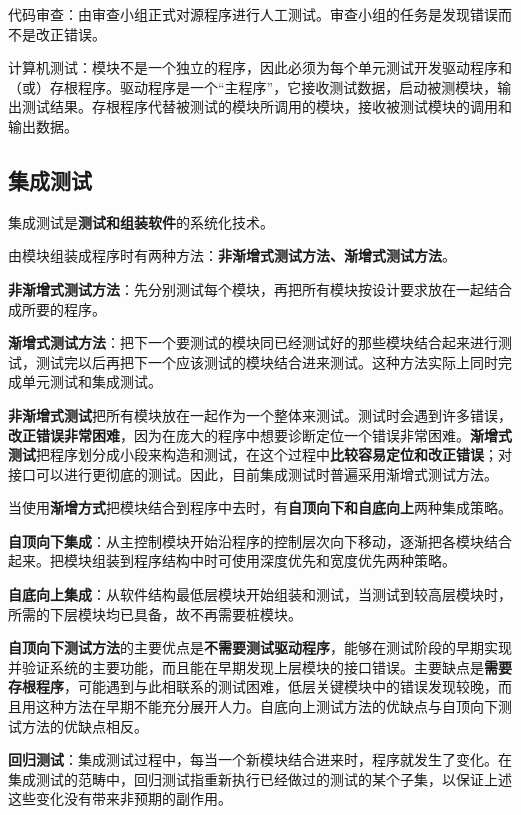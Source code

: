 \documentclass[cn, blue, normal, 12pt]{elegantnote}
\begin{document}
代码审查：由审查小组正式对源程序进行人工测试。审查小组的任务是发现错误而不是改正错误。

计算机测试：模块不是一个独立的程序，因此必须为每个单元测试开发驱动程序和（或）存根程序。驱动程序是一个“主程序”，它接收测试数据，启动被测模块，输出测试结果。存根程序代替被测试的模块所调用的模块，接收被测试模块的调用和输出数据。

\subsection{集成测试}

集成测试是\textbf{测试和组装软件}的系统化技术。

由模块组装成程序时有两种方法：\textbf{非渐增式测试方法、渐增式测试方法}。

\textbf{非渐增式测试方法}：先分别测试每个模块，再把所有模块按设计要求放在一起结合成所要的程序。

\textbf{渐增式测试方法}：把下一个要测试的模块同已经测试好的那些模块结合起来进行测试，测试完以后再把下一个应该测试的模块结合进来测试。这种方法实际上同时完成单元测试和集成测试。

\textbf{非渐增式测试}把所有模块放在一起作为一个整体来测试。测试时会遇到许多错误，\textbf{改正错误非常困难}，因为在庞大的程序中想要诊断定位一个错误非常困难。\textbf{渐增式测试}把程序划分成小段来构造和测试，在这个过程中\textbf{比较容易定位和改正错误}；对接口可以进行更彻底的测试。因此，目前集成测试时普遍采用渐增式测试方法。

当使用\textbf{渐增方式}把模块结合到程序中去时，有\textbf{自顶向下和自底向上}两种集成策略。

\textbf{自顶向下集成}：从主控制模块开始沿程序的控制层次向下移动，逐渐把各模块结合起来。把模块组装到程序结构中时可使用深度优先和宽度优先两种策略。

\textbf{自底向上集成}：从软件结构最低层模块开始组装和测试，当测试到较高层模块时，所需的下层模块均已具备，故不再需要桩模块。

\textbf{自顶向下测试方法}的主要优点是\textbf{不需要测试驱动程序}，能够在测试阶段的早期实现并验证系统的主要功能，而且能在早期发现上层模块的接口错误。主要缺点是\textbf{需要存根程序}，可能遇到与此相联系的测试困难，低层关键模块中的错误发现较晚，而且用这种方法在早期不能充分展开人力。自底向上测试方法的优缺点与自顶向下测试方法的优缺点相反。

\textbf{回归测试}：集成测试过程中，每当一个新模块结合进来时，程序就发生了变化。在集成测试的范畴中，回归测试指重新执行已经做过的测试的某个子集，以保证上述这些变化没有带来非预期的副作用。
\end{document}
